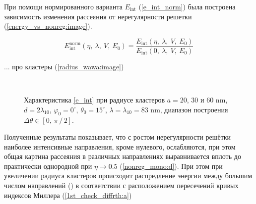 При помощи нормированного варианта $E_{\textrm{int}}$ (\autoref{e_int_norm}) была построена зависимость изменения рассеяния от нерегулярности решетки (\autoref{energy_vs_nonreg:image}).

    \begin{equation}
        E_{\textrm{int}}^{\textrm{norm}} \left( \eta,\:\lambda, \:V, \:E_0 \right) = \frac{E_{\textrm{int}} \left( \eta,\:\lambda, \:V, \:E_0 \right)}{E_{\textrm{int}} \left( 0,\:\lambda, \:V, \:E_0 \right)}\label{e_int_norm}
    \end{equation}


... про кластеры (\autoref{radius_wawa:image})

    \begin{figure}[H]
        \hfil
        \\
        \caption{Характеристика \autoref{e_int} при радиусе кластеров $a = 20$, $30$ и $60$ nm, $d = 2\lambda_{10}$, $\varphi_0 = 0^{\circ}$, $\theta_0 = 15^{\circ}$, $\lambda = \lambda_{10} = 83$ nm, диапазон построения $\Delta \theta \in \left[ 0,\:\pi\,/\,2 \right]$.}\label{radius_wawa:image}
    \end{figure}




Полученные результаты показывает, что с ростом нерегулярности решётки наиболее интенсивные направления, кроме нулевого, ослабляются, при этом общая картина рассеяния в различных направлениях выравнивается вплоть до практически однородной при $\eta \to 0.5$ (\autoref{nonreg_mono:d}). При этом при увеличении радиуса кластеров происходит распредление энергии между большим числом направлений () в соответствии с расположением пересечений кривых индексов Миллера (\autoref{1st_check_diffrth:a})